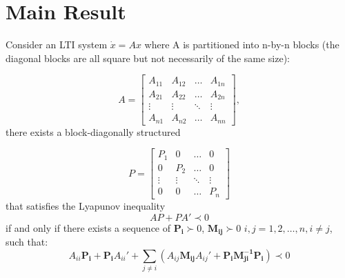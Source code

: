 \documentclass{article}
\begin{document}
\section{Main Result} %
\label{sec:problem_formulation}
Consider an LTI system $\dot x =Ax$ where A is partitioned into n-by-n blocks (the diagonal blocks are all square but not necessarily of the same size):

\[A=
\begin{bmatrix}
  A_{11} & A_{12}    & \dots  & A_{1n} \\
    A_{21} & A_{22}  & \dots  & A_{2n} \\
    \vdots & \vdots  & \ddots & \vdots \\
    A_{n1} & A_{n2}  & \dots  & A_{nn}
\end{bmatrix},
\]there exists a block-diagonally structured 

\[
P=
\begin{bmatrix}
  P_{1} & 0 & \dots  & 0\\
  0 & P_{2} & \dots  & 0 \\
    \vdots  & \vdots & \ddots & \vdots \\
    0& 0  & \dots  & P_{n}
\end{bmatrix} \]that satisfies the Lyapunov inequality 
\begin{equation}
AP+PA'\prec0  
\end{equation}\label{lumped} if and only if
there exists a sequence of $\pmb{P_i}\succ0$, $\pmb{M_{ij}}\succ0$ $i,j=1,2,\dots,n, i\neq j$, such that:
\begin{equation}
A_{ii}\pmb{P_i}+\pmb{P_i}A_{ii}'+\sum\limits_{j \neq i}(A_{ij}\pmb{M_{ij}}A_{ij}'+\pmb{P_i}\pmb{M^{-1}_{ji}}\pmb{P_{i}})\prec 0 \label{nsp}
\end{equation} 
\end{document}
